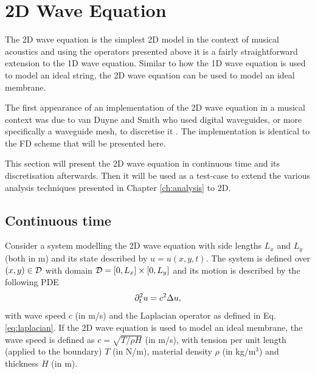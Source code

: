 \section{2D Wave Equation}\label{sec:2Dwave}
The 2D wave equation is the simplest 2D model in the context of musical acoustics and using the operators presented above it is a fairly straightforward extension to the 1D wave equation. Similar to how the 1D wave equation is used to model an ideal string, the 2D wave equation can be used to model an ideal membrane. 

The first appearance of an implementation of the 2D wave equation in a musical context was due to van Duyne and Smith who used digital waveguides, or more specifically a waveguide mesh, to discretise it \cite{Duyne1993}. The implementation is identical to the FD scheme that will be presented here.

This section will present the 2D wave equation in continuous time and its discretisation afterwards. Then it will be used as a test-case to extend the various analysis techniques presented in Chapter \ref{ch:analysis} to 2D.

\subsection{Continuous time}
Consider a system modelling the 2D wave equation with side lengths $L_x$ and $L_y$ (both in m) and its state described by $u = u(x,y,t)$. The system is defined over $(x,y) \in \mathcal{D}$ with domain $\mathcal{D} = [0, L_x] \times[0, L_y]$ and its motion is described by the following PDE
\begin{equation}\label{eq:2DwavePDE}
    \partial_t^2 u = c^2\Delta u,
\end{equation}
with wave speed $c$ (in m/s) and the Laplacian operator as defined in Eq. \eqref{eq:laplacian}. If the 2D wave equation is used to model an ideal membrane, the wave speed is defined as $c = \sqrt{T/\rho H}$ (in m/s), with tension per unit length (applied to the boundary)  $T$ (in N/m), material density $\rho$ (in kg/m$^3$) and thickness $H$ (in m).

